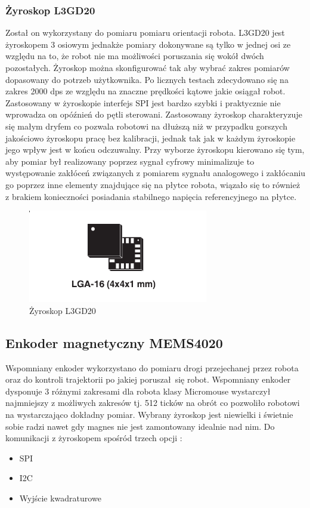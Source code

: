 \documentclass[12pt,a4paper,twoside,openright,fleqn]{mwrep}
\begin{document}
\subsubsection{Żyroskop L3GD20} %
    Został on wykorzystany do pomiaru pomiaru orientacji robota. L3GD20 jest żyroskopem 3 osiowym jednakże pomiary dokonywane są tylko w jednej osi ze względu na to, że robot nie ma możliwości poruszania się wokół dwóch pozostałych. Żyroskop można skonfigurować tak aby wybrać zakres pomiarów dopasowany do potrzeb użytkownika. Po licznych testach zdecydowano się na zakres 2000 dps ze względu na znaczne prędkości kątowe jakie osiągał robot. Zastosowany w żyroskopie interfejs SPI jest bardzo szybki i praktycznie nie wprowadza on opóźnień do pętli sterowani. Zastosowany żyroskop charakteryzuje się małym dryfem co pozwala robotowi na dłuższą niż w przypadku gorszych jakościowo żyroskopu pracę bez kalibracji, jednak tak jak w każdym żyroskopie jego wpływ jest w końcu odczuwalny. Przy wyborze żyroskopu kierowano się tym, aby pomiar był realizowany poprzez sygnał cyfrowy minimalizuje to występowanie zakłóceń związanych z pomiarem sygnału analogowego i zakłócaniu go poprzez inne elementy znajdujące się na płytce robota, wiązało się to również z brakiem konieczności posiadania stabilnego napięcia referencyjnego na płytce. 

\begin{figure}[h]
\centering
\includegraphics[width=0.7\textwidth]{./images/L3GD20}
\caption{Żyroskop L3GD20}
\label{L3GD20}
\end{figure}


\subsection{Enkoder magnetyczny MEMS4020}

Wspomniany enkoder wykorzystano do pomiaru drogi przejechanej przez robota oraz do kontroli trajektorii po jakiej poruszał się robot.  Wspomniany enkoder dysponuje 3 różnymi zakresami dla robota klasy Micromouse wystarczył najmniejszy z możliwych zakresów tj. 512 ticków na obrót co pozwoliło robotowi na wystarczająco dokładny pomiar. Wybrany żyroskop jest niewielki i świetnie sobie radzi nawet gdy magnes nie jest zamontowany idealnie nad nim. Do komunikacji z żyroskopem spośród trzech opcji :
\begin{itemize}
    \item SPI
    \item I2C
    \item Wyjście kwadraturowe
\end{itemize}
\end{document}
